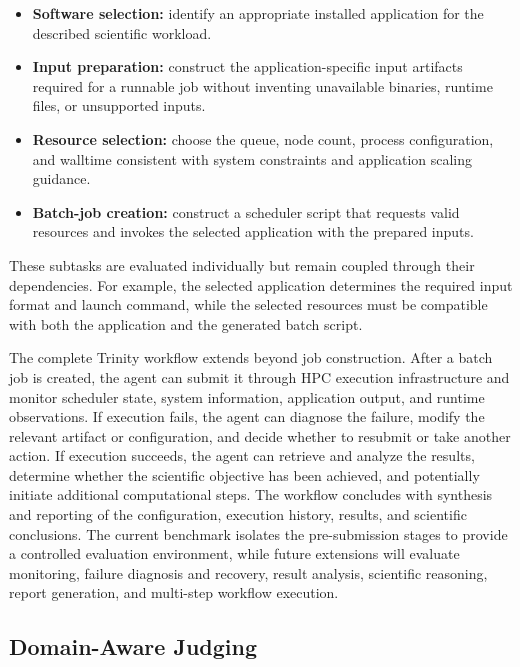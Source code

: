 \documentclass[conference]{IEEEtran}
\begin{document}
\begin{itemize}
    \item \textbf{Software selection:} identify an appropriate installed application for the described scientific workload.
    
    \item \textbf{Input preparation:} construct the application-specific input artifacts required for a runnable job without inventing unavailable binaries, runtime files, or unsupported inputs.
    
    \item \textbf{Resource selection:} choose the queue, node count, process configuration, and walltime consistent with system constraints and application scaling guidance.
    
    \item \textbf{Batch-job creation:} construct a scheduler script that requests valid resources and invokes the selected application with the prepared inputs.
\end{itemize}

These subtasks are evaluated individually but remain coupled through their dependencies. For example, the selected application determines the required input format and launch command, while the selected resources must be compatible with both the application and the generated batch script.

The complete Trinity workflow extends beyond job construction. After a batch job is created, the agent can submit it through HPC execution infrastructure and monitor scheduler state, system information, application output, and runtime observations. If execution fails, the agent can diagnose the failure, modify the relevant artifact or configuration, and decide whether to resubmit or take another action. If execution succeeds, the agent can retrieve and analyze the results, determine whether the scientific objective has been achieved, and potentially initiate additional computational steps. The workflow concludes with synthesis and reporting of the configuration, execution history, results, and scientific conclusions. The current benchmark isolates the pre-submission stages to provide a controlled evaluation environment, while future extensions will evaluate monitoring, failure diagnosis and recovery, result analysis, scientific reasoning, report generation, and multi-step workflow execution.

\subsection{Domain-Aware Judging}\label{sec:judging}
\end{document}
